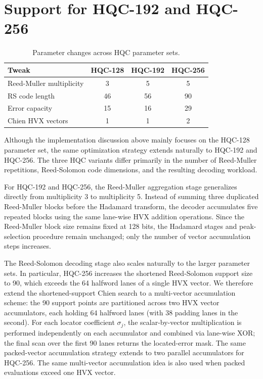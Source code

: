 \documentclass[12pt,a4paper]{report}
\begin{document}
\section{Support for HQC-192 and HQC-256}
\begin{table}[h]
\centering
\caption{Parameter changes across HQC parameter sets.}
\label{tab:param-extension}
\begin{tabular}{lccc}
\toprule
Tweak & HQC-128 & HQC-192 & HQC-256\\
\midrule
Reed-Muller multiplicity & 3 & 5 & 5\\
RS code length & 46 & 56 & 90\\
Error capacity & 15 & 16 & 29\\
Chien HVX vectors & 1 & 1 & 2\\
\bottomrule
\end{tabular}
\end{table}

Although the implementation discussion above mainly focuses on the HQC-128 parameter set, the same optimization strategy extends naturally to HQC-192 and HQC-256. The three HQC variants differ primarily in the number of Reed-Muller repetitions, Reed-Solomon code dimensions, and the resulting decoding workload.

For HQC-192 and HQC-256, the Reed-Muller aggregation stage generalizes directly from multiplicity 3 to multiplicity 5. Instead of summing three duplicated Reed-Muller blocks before the Hadamard transform, the decoder accumulates five repeated blocks using the same lane-wise HVX addition operations. Since the Reed-Muller block size remains fixed at 128 bits, the Hadamard stages and peak-selection procedure remain unchanged; only the number of vector accumulation steps increases.

The Reed-Solomon decoding stage also scales naturally to the larger parameter sets. In particular, HQC-256 increases the shortened Reed-Solomon support size to 90, which exceeds the 64 halfword lanes of a single HVX vector. We therefore extend the shortened-support Chien search to a multi-vector accumulation scheme: the 90 support points are partitioned across two HVX vector accumulators, each holding 64 halfword lanes (with 38 padding lanes in the second). For each locator coefficient $\sigma_j$, the scalar-by-vector multiplication is performed independently on each accumulator and combined via lane-wise XOR; the final scan over the first 90 lanes returns the located-error mask. The same packed-vector accumulation strategy extends to two parallel
accumulators for HQC-256. The same multi-vector accumulation idea is also used when packed evaluations exceed one HVX vector. 
\end{document}
